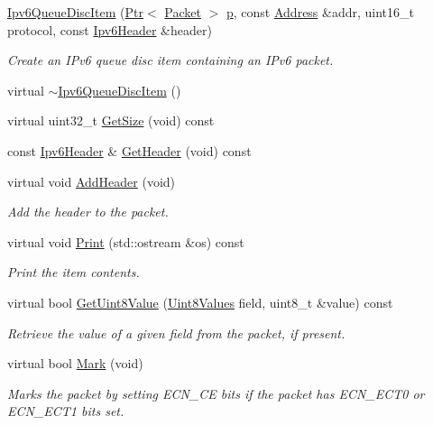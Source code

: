 \begin{DoxyCompactItemize}
\item 
\hyperlink{classns3_1_1Ipv6QueueDiscItem_a40f044073b99c978ecf2a6ee12588776}{Ipv6\+Queue\+Disc\+Item} (\hyperlink{classns3_1_1Ptr}{Ptr}$<$ \hyperlink{classns3_1_1Packet}{Packet} $>$ \hyperlink{lte__link__budget__x2__handover__measures_8m_ac9de518908a968428863f829398a4e62}{p}, const \hyperlink{classns3_1_1Address}{Address} \&addr, uint16\+\_\+t protocol, const \hyperlink{classns3_1_1Ipv6Header}{Ipv6\+Header} \&header)
\begin{DoxyCompactList}\small\item\em Create an I\+Pv6 queue disc item containing an I\+Pv6 packet. \end{DoxyCompactList}\item 
virtual \hyperlink{classns3_1_1Ipv6QueueDiscItem_aa669752d3c0ab67d7b1dcffe4439bdc1}{$\sim$\+Ipv6\+Queue\+Disc\+Item} ()
\item 
virtual uint32\+\_\+t \hyperlink{classns3_1_1Ipv6QueueDiscItem_a69e30aefdf8bd627b22bbcf5bda9fbad}{Get\+Size} (void) const 
\item 
const \hyperlink{classns3_1_1Ipv6Header}{Ipv6\+Header} \& \hyperlink{classns3_1_1Ipv6QueueDiscItem_ae05ee7c9babd918df4720232ec7a2265}{Get\+Header} (void) const 
\item 
virtual void \hyperlink{classns3_1_1Ipv6QueueDiscItem_a265d5b2e270107d4a243b0af10f01ac7}{Add\+Header} (void)
\begin{DoxyCompactList}\small\item\em Add the header to the packet. \end{DoxyCompactList}\item 
virtual void \hyperlink{classns3_1_1Ipv6QueueDiscItem_a9b64e99e0437a559771d1e429621d7a0}{Print} (std\+::ostream \&os) const 
\begin{DoxyCompactList}\small\item\em Print the item contents. \end{DoxyCompactList}\item 
virtual bool \hyperlink{classns3_1_1Ipv6QueueDiscItem_a9776fc37624e080eed7686f3f83fb770}{Get\+Uint8\+Value} (\hyperlink{classns3_1_1QueueItem_a9be6c7d46929336179fe00c3224eec9f}{Uint8\+Values} field, uint8\+\_\+t \&value) const 
\begin{DoxyCompactList}\small\item\em Retrieve the value of a given field from the packet, if present. \end{DoxyCompactList}\item 
virtual bool \hyperlink{classns3_1_1Ipv6QueueDiscItem_aa16190f85410a64feab6d39b2e7c290d}{Mark} (void)
\begin{DoxyCompactList}\small\item\em Marks the packet by setting E\+C\+N\+\_\+\+CE bits if the packet has E\+C\+N\+\_\+\+E\+C\+T0 or E\+C\+N\+\_\+\+E\+C\+T1 bits set. \end{DoxyCompactList}\end{DoxyCompactItemize}
